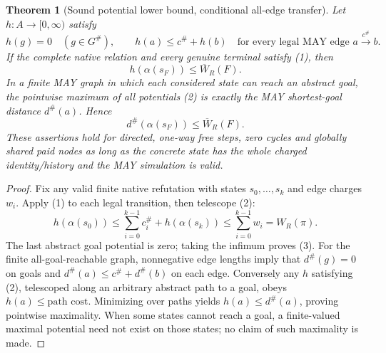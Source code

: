 \documentclass[11pt]{article}
\newtheorem{theorem}{Theorem}
\begin{document}
\begin{theorem}[Sound potential lower bound, conditional all-edge transfer]
Let \(h:A\to[0,\infty)\) satisfy
\[
 h(g)=0\quad(g\in G^\#),\qquad
 h(a)\le c^\#+h(b)
 \quad\text{for every legal MAY edge }a\xrightarrow{c^\#}b.
 \tag{2}
\]
If the complete native relation and every genuine terminal satisfy (1), then
\[
 \boxed{h(\alpha(s_F))\le \overline W_R(F).}
 \tag{3}
\]
In a \emph{finite} MAY graph in which each considered state can reach an
abstract goal, the pointwise maximum of all potentials (2) is exactly the
MAY shortest-goal distance \(d^\#(a)\). Hence
\[
 d^\#(\alpha(s_F))\le\overline W_R(F).
 \tag{4}
\]
These assertions hold for directed, one-way free steps, zero cycles and
globally shared paid nodes as long as the concrete state has the whole
charged identity/history and the MAY simulation is valid.
\end{theorem}
\begin{proof}
Fix any valid finite native refutation with states \(s_0,\ldots,s_k\)
and edge charges \(w_i\). Apply (1) to each legal transition, then telescope
(2):
\[
 h(\alpha(s_0))
 \le \sum_{i=0}^{k-1}c_i^\#+h(\alpha(s_k))
 \le \sum_{i=0}^{k-1}w_i=W_R(\pi).
\]
The last abstract goal potential is zero; taking the infimum proves (3).
For the finite all-goal-reachable graph, nonnegative edge lengths imply that
\(d^\#(g)=0\) on goals and \(d^\#(a)\le c^\#+d^\#(b)\) on each edge.
Conversely any \(h\) satisfying (2), telescoped along an arbitrary
abstract path to a goal, obeys \(h(a)\le\text{path cost}\). Minimizing over
paths yields \(h(a)\le d^\#(a)\), proving pointwise maximality.
When some states cannot reach a goal, a finite-valued maximal potential
need not exist on those states; no claim of such maximality is made.
\end{proof}
\end{document}
